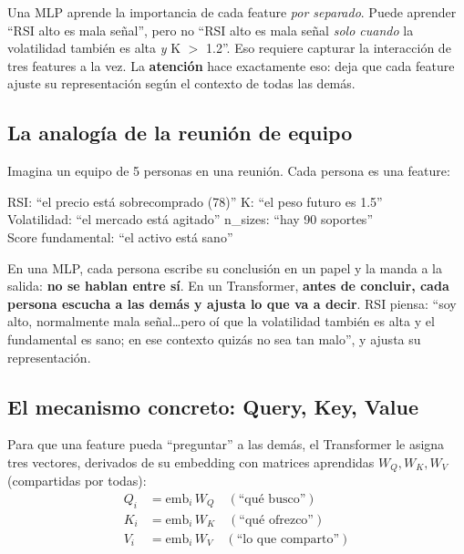 \documentclass[11pt,a4paper]{report}
\begin{document}
Una MLP aprende la importancia de cada feature \emph{por separado}. Puede aprender ``RSI alto es
mala señal'', pero no ``RSI alto es mala señal \emph{solo cuando} la volatilidad también es alta
\emph{y} K $>$ 1.2''. Eso requiere capturar la interacción de tres features a la vez. La
\textbf{atención} hace exactamente eso: deja que cada feature ajuste su representación según el
contexto de todas las demás.

\subsection{La analogía de la reunión de equipo}

Imagina un equipo de 5 personas en una reunión. Cada persona es una feature:

\begin{center}\small
RSI: ``el precio está sobrecomprado (78)'' \quad\textbullet\quad K: ``el peso futuro es 1.5''\\
Volatilidad: ``el mercado está agitado'' \quad\textbullet\quad n\_sizes: ``hay 90 soportes''\\
Score fundamental: ``el activo está sano''
\end{center}

En una MLP, cada persona escribe su conclusión en un papel y la manda a la salida:
\textbf{no se hablan entre sí}. En un Transformer, \textbf{antes de concluir, cada persona
escucha a las demás y ajusta lo que va a decir}. RSI piensa: ``soy alto, normalmente mala
señal\ldots pero oí que la volatilidad también es alta y el fundamental es sano; en ese contexto
quizás no sea tan malo'', y ajusta su representación.

\subsection{El mecanismo concreto: Query, Key, Value}

Para que una feature pueda ``preguntar'' a las demás, el Transformer le asigna tres vectores,
derivados de su embedding con matrices aprendidas $W_Q, W_K, W_V$ (compartidas por todas):
\[
\begin{aligned}
Q_i &= \text{emb}_i\, W_Q \quad(\text{``qué busco''}) \\
K_i &= \text{emb}_i\, W_K \quad(\text{``qué ofrezco''}) \\
V_i &= \text{emb}_i\, W_V \quad(\text{``lo que comparto''})
\end{aligned}
\]
\end{document}
